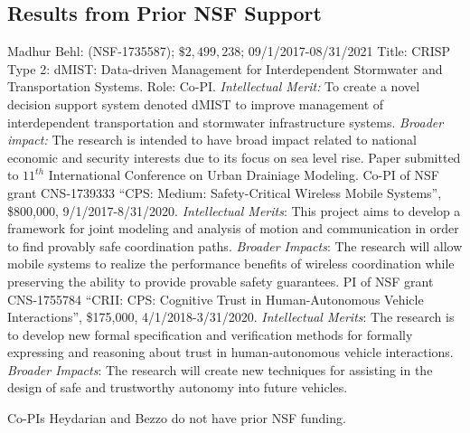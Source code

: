 \subsection{Results from Prior NSF Support}
\label{subsec:prior}
Madhur Behl: (NSF-1735587); $\$2,499,238$; 09/1/2017-08/31/2021 Title: CRISP Type 2: dMIST: Data-driven Management for Interdependent Stormwater and Transportation Systems. Role: Co-PI. \emph{Intellectual Merit:} To create a novel decision support system denoted dMIST to improve management of interdependent transportation and stormwater infrastructure systems. %
\emph{Broader impact:} The research is intended to have broad impact related to national economic and security interests due to its focus on sea level rise. Paper submitted to $11^{th}$ International Conference on Urban Drainiage Modeling. 
\newline
{}
Co-PI of NSF grant CNS-1739333 ``CPS: Medium: Safety-Critical Wireless Mobile Systems'', \$800,000, 9/1/2017-8/31/2020. \emph{Intellectual Merits}: This project aims to develop a framework for joint modeling and analysis of motion and communication in order to find provably safe coordination paths. \emph{Broader Impacts}: The research will allow mobile systems to realize the performance benefits of wireless coordination while preserving the ability to provide provable safety guarantees. 
\newline
PI of NSF grant CNS-1755784 ``CRII: CPS: Cognitive Trust in Human-Autonomous Vehicle Interactions'', \$175,000, 4/1/2018-3/31/2020.
\emph{Intellectual Merits}: The research is to develop new formal specification and verification methods for formally expressing and reasoning about trust in human-autonomous vehicle interactions.
\emph{Broader Impacts}: The research will create new techniques for assisting in the design of safe and trustworthy autonomy into future vehicles.

Co-PIs Heydarian and Bezzo do not have prior NSF funding. 
